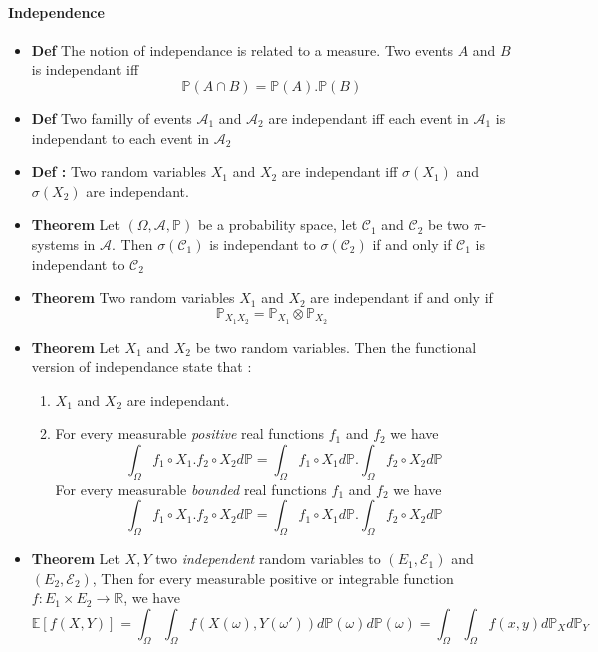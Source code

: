 \documentclass[a4paper,10pt]{article}
\begin{document}
\paragraph{Independence}
\begin{itemize}
\renewcommand{\labelitemi}{$\vcenter{\hbox{\tiny$\bullet$}}$}
 \item \textbf{Def} The notion of independance is related to a measure. Two events $A$ and $B$ is independant iff 
 \[
  \mathbb{P}(A \cap B ) = \mathbb{P}(A). \mathbb{P}(B) 
 \]
 \item \textbf{Def} Two familly of events $\mathcal{A}_1$ and $\mathcal{A}_2$ are independant iff each event in $\mathcal{A}_1$ is independant to each event in $\mathcal{A}_2$
 \item \textbf{Def : } Two random variables $X_1$ and $X_2$ are independant iff  $\sigma(X_1)$ and $\sigma(X_2)$ are independant.
 \item \textbf{Theorem } Let $(\Omega,\mathcal{A},\mathbb{P})$ be a probability space, let $\mathcal{C}_1$ and $\mathcal{C}_2$ be two $\pi$-systems in $\mathcal{A}$. Then $\sigma(\mathcal{C}_1)$ is independant to $\sigma(\mathcal{C}_2)$ if and only if $\mathcal{C}_1$ is independant to $\mathcal{C}_2$
 \item \textbf{Theorem } Two random variables $X_1$ and $X_2$ are independant if and only if 
 \[
 \mathbb{P}_{X_1X_2} = \mathbb{P}_{X_1} \otimes \mathbb{P}_{X_2}
 \]
 \item \textbf{Theorem } Let $X_1$ and $X_2$ be two random variables. Then the functional version of independance state that :
 \begin{enumerate}[i]
  \item $X_1$ and $X_2$ are independant.
  \item For every measurable \textit{positive} real functions $f_1$ and $f_2$ we have 
  \[
    \int_{\Omega} f_1 \circ X_1 . f_2 \circ X_2 d\mathbb{P} = \int_{\Omega} f_1 \circ X_1 d\mathbb{P} . \int_{\Omega} f_2 \circ X_2 d\mathbb{P} 
  \]
  For every measurable \textit{bounded} real functions $f_1$ and $f_2$ we have 
  \[
    \int_{\Omega} f_1 \circ X_1 . f_2 \circ X_2 d\mathbb{P} = \int_{\Omega} f_1 \circ X_1 d\mathbb{P} . \int_{\Omega} f_2 \circ X_2 d\mathbb{P} 
  \]
 \end{enumerate}
 \item \textbf{Theorem } Let $X,Y$ two \textit{independent} random variables to $(E_1,\mathcal{E}_1)$ and $(E_2,\mathcal{E}_2)$, Then for every measurable positive or integrable function $f : E_1\times E_2 \longrightarrow \mathbb{R}$, we have
 \[
 \mathbb{E}[f(X,Y)] = \int_{\Omega}\int_{\Omega} f(X(\omega),Y(\omega')) d\mathbb{P}(\omega)d\mathbb{P}(\omega)
                    = \int_{\Omega}\int_{\Omega} f(x,y) d\mathbb{P}_{X}d\mathbb{P}_{Y}
 \]
\end{itemize}
\end{document}

